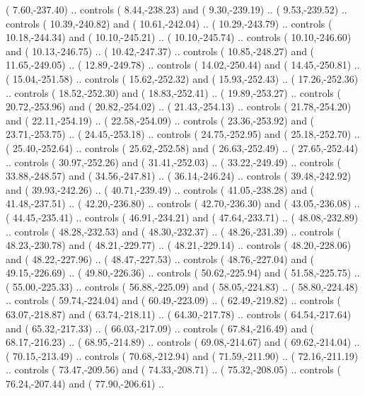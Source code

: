 {        (   7.60,-237.40) .. controls (   8.44,-238.23) and (   9.30,-239.19) ..
        (   9.53,-239.52) .. controls (  10.39,-240.82) and (  10.61,-242.04) ..
        (  10.29,-243.79) .. controls (  10.18,-244.34) and (  10.10,-245.21) ..
        (  10.10,-245.74) .. controls (  10.10,-246.60) and (  10.13,-246.75) ..
        (  10.42,-247.37) .. controls (  10.85,-248.27) and (  11.65,-249.05) ..
        (  12.89,-249.78) .. controls (  14.02,-250.44) and (  14.45,-250.81) ..
        (  15.04,-251.58) .. controls (  15.62,-252.32) and (  15.93,-252.43) ..
        (  17.26,-252.36) .. controls (  18.52,-252.30) and (  18.83,-252.41) ..
        (  19.89,-253.27) .. controls (  20.72,-253.96) and (  20.82,-254.02) ..
        (  21.43,-254.13) .. controls (  21.78,-254.20) and (  22.11,-254.19) ..
        (  22.58,-254.09) .. controls (  23.36,-253.92) and (  23.71,-253.75) ..
        (  24.45,-253.18) .. controls (  24.75,-252.95) and (  25.18,-252.70) ..
        (  25.40,-252.64) .. controls (  25.62,-252.58) and (  26.63,-252.49) ..
        (  27.65,-252.44) .. controls (  30.97,-252.26) and (  31.41,-252.03) ..
        (  33.22,-249.49) .. controls (  33.88,-248.57) and (  34.56,-247.81) ..
        (  36.14,-246.24) .. controls (  39.48,-242.92) and (  39.93,-242.26) ..
        (  40.71,-239.49) .. controls (  41.05,-238.28) and (  41.48,-237.51) ..
        (  42.20,-236.80) .. controls (  42.70,-236.30) and (  43.05,-236.08) ..
        (  44.45,-235.41) .. controls (  46.91,-234.21) and (  47.64,-233.71) ..
        (  48.08,-232.89) .. controls (  48.28,-232.53) and (  48.30,-232.37) ..
        (  48.26,-231.39) .. controls (  48.23,-230.78) and (  48.21,-229.77) ..
        (  48.21,-229.14) .. controls (  48.20,-228.06) and (  48.22,-227.96) ..
        (  48.47,-227.53) .. controls (  48.76,-227.04) and (  49.15,-226.69) ..
        (  49.80,-226.36) .. controls (  50.62,-225.94) and (  51.58,-225.75) ..
        (  55.00,-225.33) .. controls (  56.88,-225.09) and (  58.05,-224.83) ..
        (  58.80,-224.48) .. controls (  59.74,-224.04) and (  60.49,-223.09) ..
        (  62.49,-219.82) .. controls (  63.07,-218.87) and (  63.74,-218.11) ..
        (  64.30,-217.78) .. controls (  64.54,-217.64) and (  65.32,-217.33) ..
        (  66.03,-217.09) .. controls (  67.84,-216.49) and (  68.17,-216.23) ..
        (  68.95,-214.89) .. controls (  69.08,-214.67) and (  69.62,-214.04) ..
        (  70.15,-213.49) .. controls (  70.68,-212.94) and (  71.59,-211.90) ..
        (  72.16,-211.19) .. controls (  73.47,-209.56) and (  74.33,-208.71) ..
        (  75.32,-208.05) .. controls (  76.24,-207.44) and (  77.90,-206.61) ..
}

